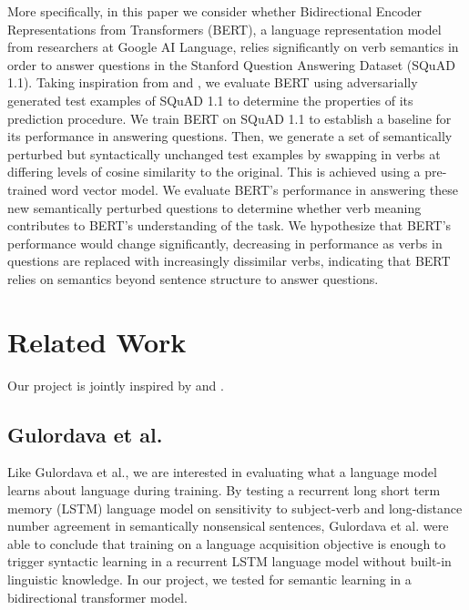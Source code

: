 \documentclass[11pt,a4paper]{article}
\begin{document}
More specifically, in this paper we consider whether Bidirectional Encoder Representations from Transformers (BERT), a language representation model from researchers at Google AI Language, relies significantly on verb semantics in order to answer questions in the Stanford Question Answering Dataset (SQuAD 1.1). Taking inspiration from \citet{gulordava-etal-2018-colorless} and \citet{jia2017adversarial}, we evaluate BERT using adversarially generated test examples of SQuAD 1.1 to determine the properties of its prediction procedure. We train BERT on SQuAD 1.1 to establish a baseline for its performance in answering questions. Then, we generate a set of semantically perturbed but syntactically unchanged test examples by swapping in verbs at differing levels of cosine similarity to the original. This is achieved using a pre-trained word vector model. We evaluate BERT’s performance in answering these new semantically perturbed questions to determine whether verb meaning contributes to BERT’s understanding of the task. We hypothesize that BERT’s performance would change significantly, decreasing in performance as verbs in questions are replaced with increasingly dissimilar verbs, indicating that BERT relies on semantics beyond sentence structure to answer questions.


\section{Related Work} \label{related work}

Our project is jointly inspired by \citet{gulordava-etal-2018-colorless} and \citet*{jia2017adversarial}.

\subsection{Gulordava et al.} 
 Like Gulordava et al., we are interested in evaluating what a language model learns about language during training. By testing a recurrent long short term memory (LSTM) language model on sensitivity to subject-verb and long-distance number agreement in semantically nonsensical sentences, Gulordava et al. were able to conclude that training on a language acquisition objective is enough to trigger syntactic learning in a recurrent LSTM language model without built-in linguistic knowledge. In our project, we tested for semantic learning in a bidirectional transformer model.
\end{document}
